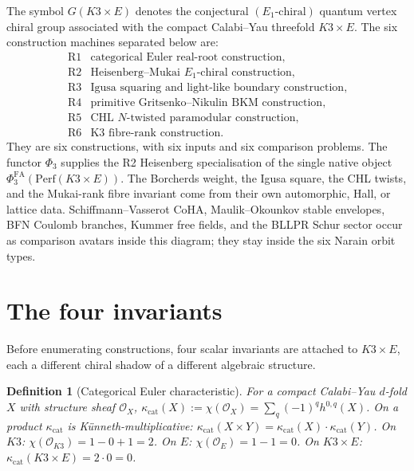 \documentclass[11pt]{article}
\newtheorem{definition}[theorem]{Definition}
\begin{document}
The symbol $G(K3 \times E)$ denotes the conjectural $(E_1\text{-chiral})$
quantum vertex chiral group associated with the compact Calabi--Yau
threefold $K3 \times E$. The six construction machines separated
below are:
\[
\begin{array}{ll}
\mathrm{R1} & \text{categorical Euler real-root construction},\\
\mathrm{R2} & \text{Heisenberg--Mukai }E_1\text{-chiral construction},\\
\mathrm{R3} & \text{Igusa squaring and light-like boundary construction},\\
\mathrm{R4} & \text{primitive Gritsenko--Nikulin BKM construction},\\
\mathrm{R5} & \text{CHL }N\text{-twisted paramodular construction},\\
\mathrm{R6} & \text{K3 fibre-rank construction}.
\end{array}
\]
They are six constructions, with six inputs and six comparison
problems. The functor $\Phi_3$ supplies the R2 Heisenberg
specialisation of the single native object
$\Phi^{\mathrm{FA}}_3(\mathrm{Perf}(K3\times E))$. The Borcherds
weight, the Igusa square, the CHL twists, and the Mukai-rank fibre
invariant come from their own automorphic, Hall, or lattice data.
Schiffmann--Vasserot CoHA, Maulik--Okounkov stable envelopes,
BFN Coulomb branches, Kummer free fields, and the BLLPR Schur
sector occur as comparison avatars inside this diagram; they stay
inside the six Narain orbit types.

\section{The four invariants}
\label{sec:four-invariants}

Before enumerating constructions, four scalar invariants are
attached to $K3 \times E$, each a different chiral shadow of a
different algebraic structure.

\begin{definition}[Categorical Euler characteristic]
\label{def:kappa-cat}
For a compact Calabi--Yau $d$-fold $X$ with structure sheaf $\mathcal O_X$,
$\kappa_{\mathrm{cat}}(X) := \chi(\mathcal O_X)
= \sum_q (-1)^q h^{0,q}(X)$.
On a product $\kappa_{\mathrm{cat}}$ is K\"unneth-multiplicative:
$\kappa_{\mathrm{cat}}(X \times Y)
= \kappa_{\mathrm{cat}}(X) \cdot \kappa_{\mathrm{cat}}(Y)$.
On $K3$: $\chi(\mathcal O_{K3}) = 1 - 0 + 1 = 2$. On $E$:
$\chi(\mathcal O_E) = 1 - 1 = 0$. On $K3 \times E$:
$\kappa_{\mathrm{cat}}(K3 \times E) = 2 \cdot 0 = 0$.
\end{definition}
\end{document}
